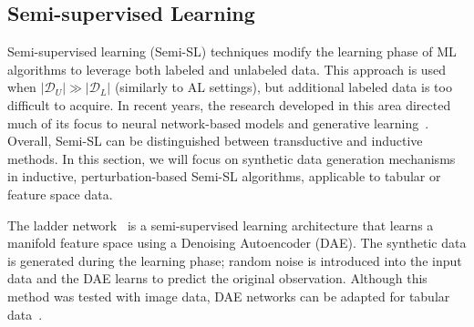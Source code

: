 \documentclass[parskip=full]{scrartcl}
\begin{document}
% 
% 
% 
% 

\subsection{Semi-supervised Learning}\label{sec:semi-supervised-learning}

Semi-supervised learning (Semi-SL) techniques modify the learning phase of ML
algorithms to leverage both labeled and unlabeled data. This approach is used
when $|\mathcal{D}_U| \gg |\mathcal{D}_L|$ (similarly to AL settings), but
additional labeled data is too difficult to acquire. In recent years,
the research developed in this area directed much of its focus to neural
network-based models and generative learning~\cite{van2020survey}. Overall,
Semi-SL can be distinguished between transductive and inductive methods. In
this section, we will focus on synthetic data generation mechanisms in
inductive, perturbation-based Semi-SL algorithms, applicable to tabular or
feature space data.

The ladder network~\cite{rasmus2015semi} is a semi-supervised learning
architecture that learns a manifold feature space using a Denoising
Autoencoder (DAE). The synthetic data is generated during the learning phase;
random noise is introduced into the input data and the DAE learns to predict
the original observation. Although this method was tested with image data,
DAE networks can be adapted for tabular data~\cite{sattarov2022explaining}.
\end{document}
